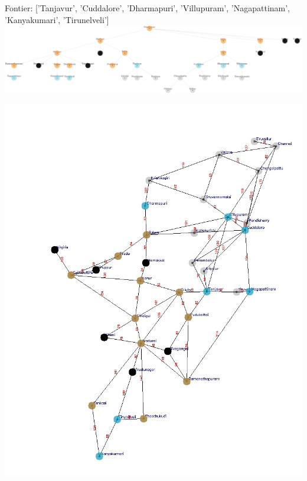 \documentclass[xcolor=table]{beamer}
\begin{document}
\begin{frame}
  { \tiny Fontier: ['Tanjavur', 'Cuddalore', 'Dharmapuri', 'Villupuram', 'Nagapattinam', 'Kanyakumari', 'Tirunelveli']}
  \includegraphics[width=1\textwidth]{../BFSNodes/25-1.png}
  \begin{center}
    \includegraphics[height=0.6\textheight]{../BFSoutput/tamilBFS23.jpg}
  \end{center}
\end{frame}
\end{document}

